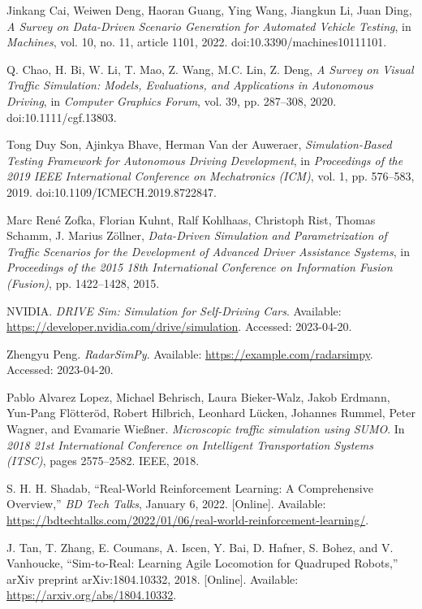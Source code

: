 \documentclass[lettersize,journal]{IEEEtran}
\begin{document}
\begin{thebibliography}{1}
Jinkang Cai, Weiwen Deng, Haoran Guang, Ying Wang, Jiangkun Li, Juan Ding,
\textit{A Survey on Data-Driven Scenario Generation for Automated Vehicle Testing}, in \textit{Machines}, vol. 10, no. 11, article 1101, 2022.
doi:10.3390/machines10111101.


Q. Chao, H. Bi, W. Li, T. Mao, Z. Wang, M.C. Lin, Z. Deng,
\textit{A Survey on Visual Traffic Simulation: Models, Evaluations, and Applications in Autonomous Driving}, in \textit{Computer Graphics Forum}, vol. 39, pp. 287--308, 2020.
doi:10.1111/cgf.13803.


Tong Duy Son, Ajinkya Bhave, Herman Van der Auweraer,
\textit{Simulation-Based Testing Framework for Autonomous Driving Development}, in \textit{Proceedings of the 2019 IEEE International Conference on Mechatronics (ICM)}, vol. 1, pp. 576--583, 2019.
doi:10.1109/ICMECH.2019.8722847.


Marc René Zofka, Florian Kuhnt, Ralf Kohlhaas, Christoph Rist, Thomas Schamm, J. Marius Zöllner,
\textit{Data-Driven Simulation and Parametrization of Traffic Scenarios for the Development of Advanced Driver Assistance Systems}, in \textit{Proceedings of the 2015 18th International Conference on Information Fusion (Fusion)}, pp. 1422--1428, 2015.

NVIDIA.
\newblock \emph{DRIVE Sim: Simulation for Self-Driving Cars}.
\newblock Available: \url{https://developer.nvidia.com/drive/simulation}. Accessed: 2023-04-20.

Zhengyu Peng.
\newblock \emph{RadarSimPy}.
\newblock Available: \url{https://example.com/radarsimpy}. Accessed: 2023-04-20.

Pablo Alvarez Lopez, Michael Behrisch, Laura Bieker-Walz, Jakob Erdmann, Yun-Pang Fl\"otter\"od, Robert Hilbrich, Leonhard L\"ucken, Johannes Rummel, Peter Wagner, and Evamarie Wie\ss{}ner.
\newblock \emph{Microscopic traffic simulation using SUMO}.
\newblock In \emph{2018 21st International Conference on Intelligent Transportation Systems (ITSC)}, pages 2575--2582. IEEE, 2018.

S. H. H. Shadab,
``Real-World Reinforcement Learning: A Comprehensive Overview,''
\emph{BD Tech Talks}, January 6, 2022. [Online]. Available: \url{https://bdtechtalks.com/2022/01/06/real-world-reinforcement-learning/}.

J. Tan, T. Zhang, E. Coumans, A. Iscen, Y. Bai, D. Hafner, S. Bohez, and V. Vanhoucke,
``Sim-to-Real: Learning Agile Locomotion for Quadruped Robots,''
arXiv preprint arXiv:1804.10332, 2018. [Online]. Available: \url{https://arxiv.org/abs/1804.10332}.


\end{thebibliography}
\end{document}
